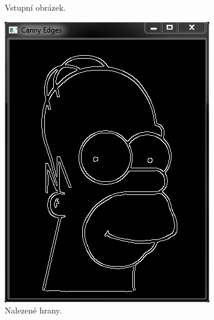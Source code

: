 \documentclass[12pt, a4paper]{article}
\begin{document}
{\begin{figure}[!ht]
\begin{minipage}[t]{0.49\textwidth}
		\caption{Vstupní obrázek.}
		\label{fig:Homer}
	\end{minipage}%
	\hfill
	\begin{minipage}[t]{0.49\textwidth}
		\includegraphics[width = \textwidth]{CannyHomer.png}
		\caption{Nalezené hrany.}
		\label{fig:CannyHomer}
	\end{minipage}%
\end{figure}
\begin{figure}[!ht]
	\centering
	\begin{minipage}[t]{0.49\textwidth}

\end{minipage}
\end{figure}}
\end{document}
